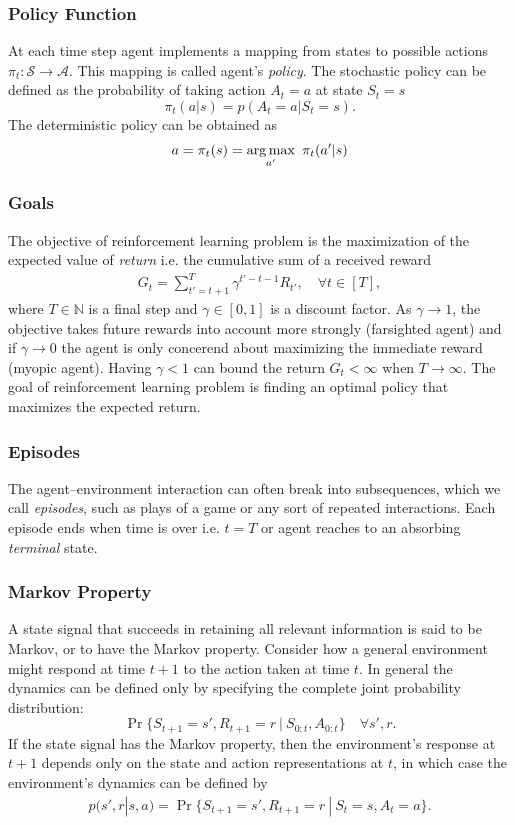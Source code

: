\documentclass[letterpaper,titlepage]{article}
\begin{document}
\subsubsection*{Policy Function}
At each time step agent implements a mapping from states to possible actions $\pi_t : \mathcal{S} \rightarrow \mathcal{A}$. This mapping is called agent's \emph{policy}. The stochastic policy can be defined as the probability of taking action $A_t = a$ at state $S_t = s$
\[
\pi_t ( a | s ) = p( A_t = a | S_t = s ).
\] 
The deterministic policy can be obtained as
\[
a = \pi_t ( s ) = \operatorname*{arg\,max}_{a'} ~ \pi_t ( a' | s )
\]
\subsubsection*{Goals}
The objective of reinforcement learning problem is the maximization of the expected value of \emph{return} i.e. the cumulative sum of a received reward
\begin{align}
G_t = \sum_{t' = t + 1}^{T} \gamma^{t' - t - 1} R_{t'}, \quad \forall t \in [T],
\end{align}
where $T \in \mathbb{N}$ is a final step and $\gamma \in [0,1]$ is a discount factor. As $\gamma \rightarrow 1$, the objective takes future rewards into account more strongly (farsighted agent) and if $\gamma \rightarrow 0$ the agent is only concerend about maximizing the immediate reward (myopic agent). Having $\gamma < 1$ can bound the return $G_t < \infty$ when $T \rightarrow \infty$. The goal of reinforcement learning problem is finding an optimal policy that maximizes the expected return. 
\subsubsection*{Episodes}
The agent–environment interaction can often break into subsequences, which we call \emph{episodes}, such as plays of a game or any sort of repeated interactions. Each episode ends when time is over i.e. $t = T$ or agent reaches to an absorbing \emph{terminal} state.  
\subsubsection*{Markov Property}
A state signal that succeeds in retaining all relevant information is said to be Markov, or to have the Markov property. Consider how a general environment might respond at time $t + 1$ to the action taken at time $t$. In general the dynamics can be defined only by specifying the complete joint probability distribution:
\[
\Pr \{ S_{t+1} = s', R_{t+1} = r ~ | ~ S_{0:t}, A_{0:t}  \} \quad \forall s',r.
\]
If the state signal has the Markov property, then the environment's response at $t + 1 $ depends only on the state and action representations at $t$, in which case the environment's dynamics can be defined by
\begin{align}
p( s', r | s, a ) = \Pr \{ S_{t+1} = s', R_{t+1} = r ~ | ~ S_{t}=s, A_{t}=a  \}.
\label{eq:dynamics}
\end{align}
\end{document}
